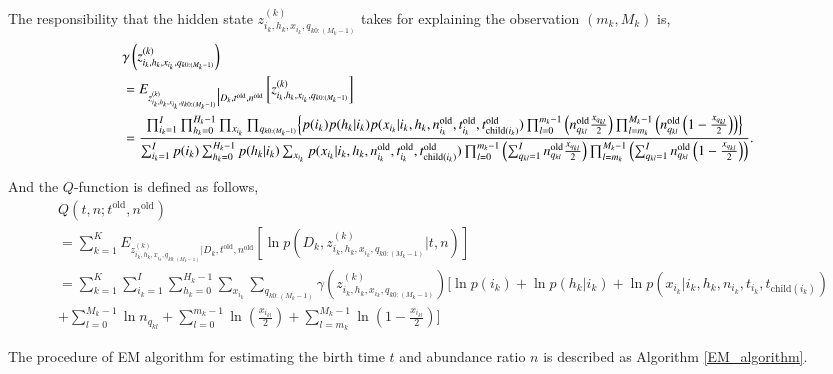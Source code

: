 \documentclass{article}
\begin{document}
The responsibility that the hidden state $z^{(k)}_{i_k, h_k, x_{i_k}, q_{k 0:(M_k - 1)}}$ takes for explaining the observation $(m_k, M_k)$ is,
\begin{align}
& \gamma\left(z^{(k)}_{i_k, h_k, x_{i_k}, q_{k 0:(M_k - 1)}}\right)\\
 & = E_{z^{(k)}_{i_k, h_k, x_{i_k}, q_{k 0:(M_k - 1)}} \big| D_k, t^{\mathrm{old}}, n^{\mathrm{old}}} \left[z^{(k)}_{i_k, h_k, x_{i_k}, q_{k 0:(M_k - 1)}}\right]\\
 & = \frac{\prod_{i_k=1}^{I} \prod_{h_k=0}^{H_k - 1} \prod_{x_{i_k}} \prod_{q_{k 0:(M_k - 1)}} \Bigl\{p(i_k) p(h_k | i_k) p(x_{i_k} | i_k, h_k, n_{i_k}^{\mathrm{old}}, t_{i_k}^{\mathrm{old}}, t_{\mathrm{child}(i_k)}^{\mathrm{old}}) \prod_{l=0}^{m_k - 1} \left( n_{q_{kl}}^{\mathrm{old}} \frac{x_{q_{kl}}}{2} \right) \prod_{l=m_k}^{M_k - 1} \left( n_{q_{kl}}^{\mathrm{old}} \left(1-\frac{x_{q_{kl}}}{2} \right) \right) \Bigr\}}
 {\sum_{i_k=1}^{I} p(i_k) \sum_{h_k=0}^{H_k - 1} p(h_k | i_k) \sum_{x_{i_k}} p(x_{i_k} | i_k, h_k, n_{i_k}^{\mathrm{old}}, t_{i_k}^{\mathrm{old}}, t_{\mathrm{child}(i_k)}^{\mathrm{old}}) \prod_{l=0}^{m_k - 1} \left( \sum_{q_{kl}=1}^{I} n_{q_{kl}}^{\mathrm{old}} \frac{x_{q_{kl}}}{2} \right) \prod_{l=m_k}^{M_k - 1} \left( \sum_{q_{kl}=1}^{I} n_{q_{kl}}^{\mathrm{old}} \left(1-\frac{x_{q_{kl}}}{2} \right) \right)}.
\end{align}

And the $Q$-function is defined as follows,
\begin{align}
 & Q(t,n;t^{\mathrm{old}},n^{\mathrm{old}})\nonumber\\
 & = \sum_{k=1}^{K} E_{z^{(k)}_{i_k, h_k, x_{i_k}, q_{k 0:(M_k - 1)}} \big| D_k, t^{\mathrm{old}}, n^{\mathrm{old}}}
 \left[ \ln p\left(D_k, z^{(k)}_{i_k, h_k, x_{i_k}, q_{k 0:(M_k - 1)}} \big| t,n\right) \right]\nonumber\\
 & = \sum_{k=1}^{K}\sum_{i_k=1}^{I}\sum_{h_k=0}^{H_k - 1}\sum_{x_{i_k}} \sum_{q_{k0:(M_k-1)}} \gamma(z^{(k)}_{i_k, h_k, x_{i_k}, q_{k 0:(M_k - 1)}})\Biggl[\ln p(i_k) + \ln p(h_k | i_k) + \ln p(x_{i_k} | i_k, h_k, n_{i_k}, t_{i_k}, t_{\mathrm{child}(i_k)})\nonumber\\
 & + \sum_{l=0}^{M_k - 1} \ln n_{q_{kl}} + \sum_{l=0}^{m_k - 1} \ln \left(\frac{x_{i_{kl}}}{2}\right) + \sum_{l=m_k}^{M_k -1} \ln \left(1 - \frac{x_{i_{kl}}}{2}\right) \Biggr]
\end{align}

The procedure of EM algorithm for estimating the birth time $t$ and abundance ratio $n$ is described as Algorithm \ref{EM_algorithm}.
\end{document}
